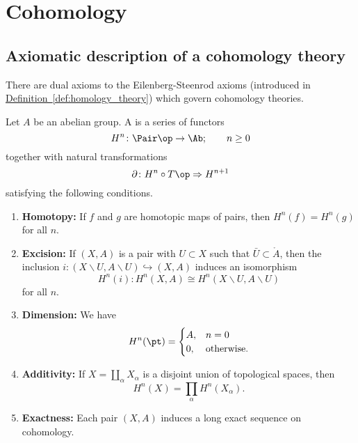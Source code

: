 \documentclass[main.tex]{subfiles}
\begin{document}
\chapter{Cohomology}
\label{ch:cohomology}

\section{Axiomatic description of a cohomology theory}
\label{sec:axiomatic_description_of_a_cohomology_theory}

There are dual axioms to the Eilenberg-Steenrod axioms (introduced in \hyperref[def:homology_theory]{Definition~\ref*{def:homology_theory}}) which govern cohomology theories.

\begin{definition}
  \label{def:cohomology_theory}
  Let $A$ be an abelian group. A  is a series of functors
  \begin{equation*}
    H^{n}\colon \Pair\op \to \Ab;\qquad n \geq 0
  \end{equation*}
  together with natural transformations
  \begin{equation*}
    \partial\colon H^{n} \circ T\op \Rightarrow H^{n+1}
  \end{equation*}
  satisfying the following conditions.
  \begin{enumerate}
    \item \textbf{Homotopy:} If $f$ and $g$ are homotopic maps of pairs, then $H^{n}(f) = H^{n}(g)$ for all $n$.

    \item \textbf{Excision:} If $(X, A)$ is a pair with $U \subset X$ such that $\bar{U} \subset \mathring{A}$, then the inclusion $i\colon (X\smallsetminus U, A \smallsetminus U) \hookrightarrow (X, A)$ induces an isomorphism
      \begin{equation*}
        H^{n}(i)\colon H^{n}(X, A) \cong H^{n}(X \smallsetminus U, A \smallsetminus U)
      \end{equation*}
      for all $n$.

    \item \textbf{Dimension:} We have
      \begin{equation*}
        H^{n}(\pt) =
        \begin{cases}
          A, &n = 0 \\
          0, &\text{otherwise}.
        \end{cases}
      \end{equation*}

    \item \textbf{Additivity:} If $X = \coprod_{\alpha} X_{\alpha}$ is a disjoint union of topological spaces, then
      \begin{equation*}
        H^{n}(X) = \prod_{\alpha} H^{n}(X_{\alpha}).
      \end{equation*}

    \item \textbf{Exactness:} Each pair $(X, A)$ induces a long exact sequence on cohomology.
  \end{enumerate}
\end{definition}
\end{document}
